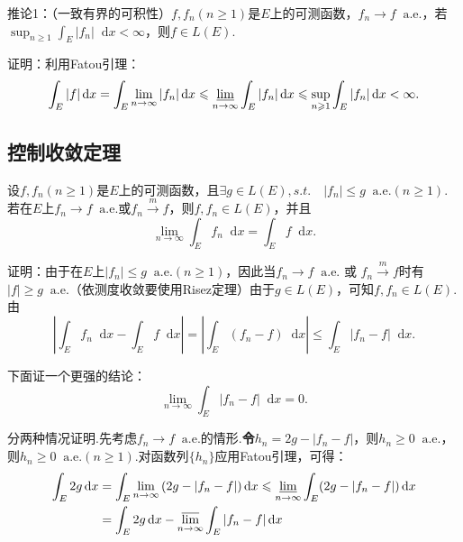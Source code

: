 \documentclass[bwprint, withoutpreface]{cumcmthesis}
\newcommand*{\dif}{\mathop{}\!\mathrm{d}}
\begin{document}
推论1：（一致有界的可积性）$f, f_n(n \geqslant 1)$是$E$上的可测函数，$f_n \to f \mathop{} \! \mathrm{a.e.}$，若$\sup_{n \geqslant 1}{\int_E |f_n| \dif x} < \infty$，则$f \in L(E)$.

证明：利用Fatou引理：
\begin{equation*}
	\int_E |f| \dif x = \int_E \lim_{n \to \infty}{|f_n|} \dif x \leqslant \varliminf_{n \to \infty}{\int_E |f_n| \dif x} \leqslant \sup_{n \geqslant 1}{\int_E |f_n| \dif x} < \infty.
\end{equation*}

\subsection{控制收敛定理}
设$f, f_n(n \geqslant 1)$是$E$上的可测函数，且$\exists g \in L(E), s.t. \quad |f_n| \leqslant g \mathop{} \! \mathrm{a.e.} (n \geqslant 1)$. 若在$E$上$f_n \to f \mathop{} \! \mathrm{a.e.}$或$f_n \stackrel{m}{\longrightarrow} f$，则$f, f_n \in L(E)$，并且
\begin{equation*}
	\lim_{n \to \infty} \int_E f_n \dif x = \int_E f \dif x.
\end{equation*}

证明：由于在$E$上$|f_n| \leqslant g \mathop{} \! \mathrm{a.e.} (n \geqslant 1)$，因此当$f_n \to f \mathop{} \! \mathrm{a.e.}$ 或 $f_n \stackrel{m}{\longrightarrow} f$时有$|f| \geqslant g \mathop{} \! \mathrm{a.e.}$（依测度收敛要使用Risez定理）由于$g \in L(E)$，可知$f, f_n \in L(E)$. 由
\begin{equation*}
	|\int_E f_n \dif x - \int_E f \dif x| = |\int_E (f_n - f) \dif x| \leqslant \int_E |f_n - f| \dif x.
\end{equation*}

下面证一个更强的结论：
\begin{equation*}
	\lim_{n \to \infty}{\int_E |f_n - f| \dif x} = 0.
\end{equation*}

分两种情况证明.先考虑$f_n \to f \mathop{} \! \mathrm{a.e.}$的情形.\textbf{令$h_n = 2g - |f_n - f|$}，则$h_n \geqslant 0 \mathop{} \! \mathrm{a.e.}$，则$h_n \geqslant 0 \mathop{} \! \mathrm{a.e.} (n \geqslant 1)$.对函数列$\{h_n\}$应用Fatou引理，可得：
\begin{align*}
	\int_E 2g \dif x & = \int_E \lim_{n \to \infty}{(2g - |f_n - f|) \dif x}  \leqslant \varliminf_{n \to \infty}{\int_E (2g - |f_n - f|) \dif x} \\
				     & = \int_E 2g \dif x - \varlimsup_{n \to \infty}{\int_E |f_n - f| \dif x}
\end{align*}
\end{document}
